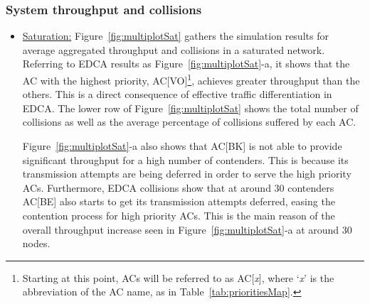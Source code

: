 \subsubsection{System throughput and collisions}
\begin{itemize}
\item\underline{Saturation:} Figure~\ref{fig:multiplotSat} gathers the simulation results for average aggregated throughput and collisions in a saturated network. Referring to EDCA results as Figure~\ref{fig:multiplotSat}-a,  it shows that the AC with the highest priority, AC[VO]\footnote{Starting at this point, ACs will be referred to as AC[\emph{x}], where `\emph{x}' is the abbreviation of the AC name, as in Table~\ref{tab:prioritiesMap}.}, achieves greater throughput than the others. This is a direct consequence of effective traffic differentiation in EDCA. The lower row of Figure~\ref{fig:multiplotSat} shows the total number of collisions as well as the average percentage of collisions suffered by each AC. 

Figure~\ref{fig:multiplotSat}-a also shows that AC[BK] is not able to provide significant throughput for a high number of contenders. This is because its transmission attempts are being deferred in order to serve the high priority ACs. Furthermore, EDCA collisions show that at around 30 contenders AC[BE] also starts to get its transmission attempts deferred, easing the contention process for high priority ACs. This is the main reason of the overall throughput increase seen in Figure~\ref{fig:multiplotSat}-a at around 30 nodes.

%
	
%


\end{itemize}
